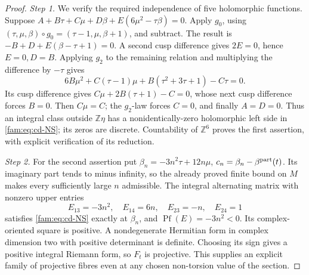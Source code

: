 \documentclass[11pt,a4paper]{article}
\theoremstyle{plain}
\theoremstyle{definition}
\begin{document}
\begin{proof}
\par\noindent\textit{Step 1.} We verify the required independence of five holomorphic functions.
Suppose \(A+B\tau+C\mu+D\beta+E(6\mu^2-\tau\beta)=0\).
Apply \(g_0\), using \((\tau,\mu,\beta)\circ g_0=(\tau-1,\mu,\beta+1)\),
and subtract. The result is \(-B+D+E(\beta-\tau+1)=0\).
A second cusp difference gives \(2E=0\), hence \(E=0,D=B\).
Applying \(g_2\) to the remaining relation and multiplying the difference
by \(-\tau\) gives
\[
 6B\mu^2+C(\tau-1)\mu+B(\tau^2+3\tau+1)-C\tau=0.
\]
Its cusp difference gives \(C\mu+2B(\tau+1)-C=0\), whose next cusp
difference forces \(B=0\). Then \(C\mu=C\); the \(g_2\)-law forces
\(C=0\), and finally \(A=D=0\). Thus an integral class outside
\(\mathbb Z\eta\) has a nonidentically-zero holomorphic left side in
\eqref{fam:eq:cd-NS}; its zeros are discrete. Countability of \(\mathbb Z^6\)
proves the first assertion, with explicit verification of its reduction.

\par\noindent\textit{Step 2.} For the second assertion put
\(\beta_n=-3n^2\tau+12n\mu\),
\(c_n=\beta_n-\beta^{\rm part}(t)\). Its imaginary part tends to
minus infinity, so the already proved finite bound on \(M\) makes every
sufficiently large \(n\) admissible. The integral alternating matrix
with nonzero upper entries
\[
 E_{13}=-3n^2,\quad E_{14}=6n,\quad E_{23}=-n,\quad E_{24}=1
\]
satisfies \eqref{fam:eq:cd-NS} exactly at \(\beta_n\), and
\(\operatorname{Pf}(E)=-3n^2<0\). Its complex-oriented square is positive.
A nondegenerate Hermitian form in complex dimension two with positive
determinant is definite. Choosing its sign gives a positive integral
Riemann form, so \(F_t\) is projective. This supplies an explicit family
of projective fibres even at any chosen non-torsion value of the section.
\end{proof}
\end{document}
